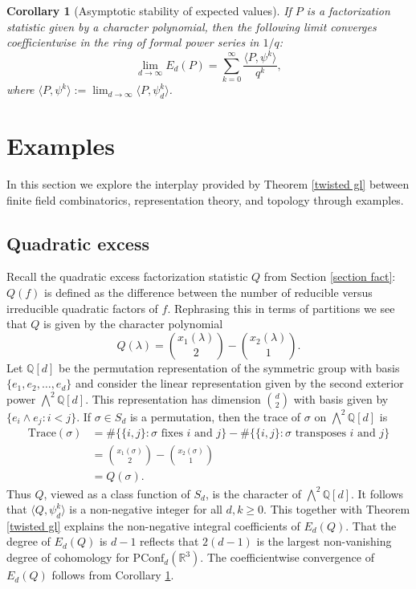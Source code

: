 \documentclass[submission]{FPSAC2018}
\newtheorem{cor}[thm]{Corollary}
\theoremstyle{definition}
\numberwithin{equation}{section}
\def\QQ{\mathbb{Q}}
\def\RR{\mathbb{R}}
\newcommand\PConf{\mathrm{PConf}}
\begin{document}
\begin{cor}[Asymptotic stability of expected values]
\label{cor converge}
If $P$ is a factorization statistic given by a character polynomial, then the following limit converges coefficientwise in the ring of formal power series in $1/q$:
\[
    \lim_{d\rightarrow\infty}E_d(P) = \sum_{k=0}^\infty \frac{\langle P, \psi^k \rangle}{q^k},
\]
where $\langle P, \psi^k \rangle := \lim_{d\rightarrow\infty} \langle P, \psi_d^k \rangle$.
\end{cor}



\section{Examples}
\label{section example}

In this section we explore the interplay provided by Theorem \ref{twisted gl} between finite field combinatorics, representation theory, and topology through examples.

\subsection{Quadratic excess}
\label{sec quad}
Recall the quadratic excess factorization statistic $Q$ from Section \ref{section fact}: $Q(f)$ is defined as the difference between the number of reducible versus irreducible quadratic factors of $f$. Rephrasing this in terms of partitions we see that $Q$ is given by the character polynomial
\[
    Q(\lambda) = \binom{x_1(\lambda)}{2} - \binom{x_2(\lambda)}{1}.
\]
Let $\QQ[d]$ be the permutation representation of the symmetric group with basis $\{e_1, e_2, \ldots , e_d\}$ and consider the linear representation given by the second exterior power $\bigwedge^2 \QQ[d]$. This representation has dimension $\binom{d}{2}$ with basis given by $\{e_i \wedge e_j : i < j\}$. If $\sigma \in S_d$ is a permutation, then the trace of $\sigma$ on $\bigwedge^2 \QQ[d]$ is
\begin{align*}
    \mathrm{Trace}(\sigma) &= \#\{\{i,j\} : \sigma \text{ fixes $i$ and $j$}\} - \#\{\{i,j\} : \sigma \text{ transposes $i$ and $j$}\}\\
    &= \binom{x_1(\sigma)}{2} - \binom{x_2(\sigma)}{1}\\
    &= Q(\sigma).
\end{align*}
Thus $Q$, viewed as a class function of $S_d$, is the character of $\bigwedge^2\QQ[d]$. It follows that $\langle Q, \psi_d^k \rangle$ is a non-negative integer for all $d, k \geq 0$. This together with Theorem \ref{twisted gl} explains the non-negative integral coefficients of $E_d(Q)$. That the degree of $E_d(Q)$ is $d - 1$ reflects that $2(d - 1)$ is the largest non-vanishing degree of cohomology for $\PConf_d(\RR^3)$. The coefficientwise convergence of $E_d(Q)$ follows from Corollary \ref{cor converge}.
\end{document}
